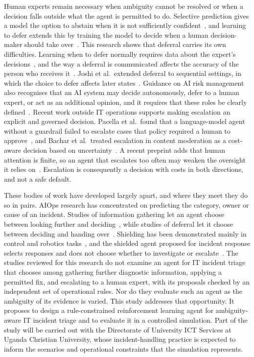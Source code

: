 Human experts remain necessary when ambiguity cannot be resolved or when a decision falls outside what the agent is permitted to do. Selective prediction gives a model the option to abstain when it is not sufficiently confident~\cite{geifman2019}, and learning to defer extends this by training the model to decide when a human decision-maker should take over~\cite{madras2018}. This research shows that deferral carries its own difficulties. Learning when to defer normally requires data about the expert's decisions~\cite{hemmer2023}, and the way a deferral is communicated affects the accuracy of the person who receives it~\cite{bondi2022}. Joshi et al.\ extended deferral to sequential settings, in which the choice to defer affects later states~\cite{joshi2023}. Guidance on AI risk management also recognises that an AI system may decide autonomously, defer to a human expert, or act as an additional opinion, and it requires that these roles be clearly defined~\cite{nist2023}. Recent work outside IT operations supports making escalation an explicit and governed decision. Pacella et al.\ found that a language-model agent without a guardrail failed to escalate cases that policy required a human to approve~\cite{pacella2026}, and Bachar et al.\ treated escalation in content moderation as a cost-aware decision based on uncertainty~\cite{bachar2026}. A recent preprint adds that human attention is finite, so an agent that escalates too often may weaken the oversight it relies on~\cite{turan2026}. Escalation is consequently a decision with costs in both directions, and not a safe default.

These bodies of work have developed largely apart, and where they meet they do so in pairs. AIOps research has concentrated on predicting the category, owner or cause of an incident. Studies of information gathering let an agent choose between looking further and deciding~\cite{janisch2019,kim2025}, while studies of deferral let it choose between deciding and handing over~\cite{madras2018,joshi2023}. Shielding has been demonstrated mainly in control and robotics tasks~\cite{alshiekh2018,achiam2017,zhao2023}, and the shielded agent proposed for incident response selects responses and does not choose whether to investigate or escalate~\cite{alauthman2026}. The studies reviewed for this research do not examine an agent for IT incident triage that chooses among gathering further diagnostic information, applying a permitted fix, and escalating to a human expert, with its proposals checked by an independent set of operational rules. Nor do they evaluate such an agent as the ambiguity of its evidence is varied. This study addresses that opportunity. It proposes to design a rule-constrained reinforcement learning agent for ambiguity-aware IT incident triage and to evaluate it in a controlled simulation. Part of the study will be carried out with the Directorate of University ICT Services at Uganda Christian University, whose incident-handling practice is expected to inform the scenarios and operational constraints that the simulation represents.

